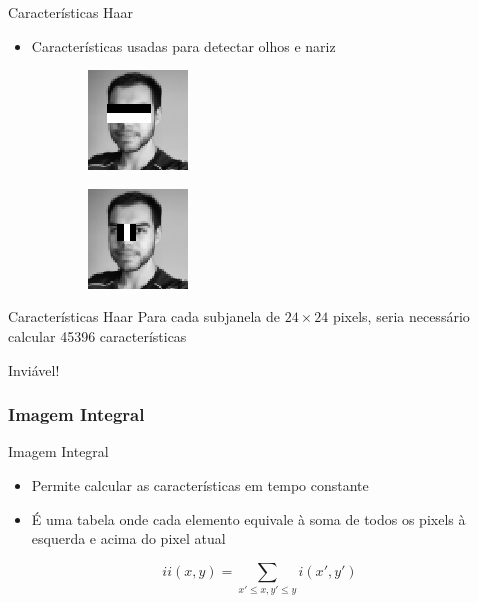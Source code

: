 \begin{frame}{Características Haar}
\begin{itemize}
    \item Características usadas para detectar olhos e nariz
\end{itemize}

\begin{figure}[htbp]
    \begin{subfigure}[c]{0.4\textwidth}
    \centering
    \includegraphics{imagens/julio_haar2.png}
    \end{subfigure}
    \begin{subfigure}[c]{0.4\textwidth}
    \centering
    \includegraphics{imagens/julio_haar3.png}
    \end{subfigure}
\end{figure}
\end{frame}


\begin{frame}{Características Haar}
Para cada subjanela de $24\times24$ pixels, seria necessário calcular 45396 características

\begin{center}{\huge Inviável!}\end{center}

\end{frame}


\subsubsection{Imagem Integral}


\begin{frame}{Imagem Integral}
\begin{itemize}
    \item Permite calcular as características em tempo constante
    \item É uma tabela onde cada elemento equivale à soma de todos os pixels à esquerda e acima do pixel atual
\end{itemize}

\begin{equation*} \label{eq:imagemintegral}
    ii(x,y) = \sum_{{x}'\leq x, {y}'\leq y} i({x}', {y}')
\end{equation*}

\end{frame}

